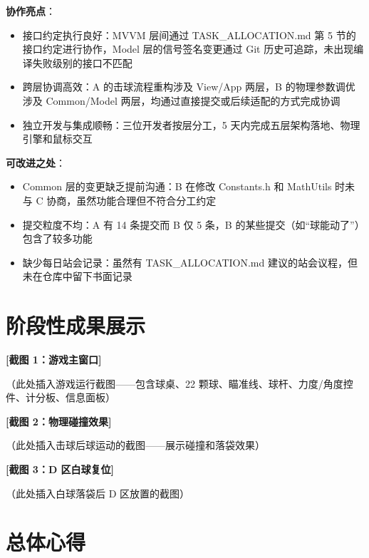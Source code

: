 \documentclass[11pt]{ctexart}
\begin{document}
\textbf{协作亮点}：
\begin{itemize}
\item 接口约定执行良好：MVVM 层间通过 TASK\_ALLOCATION.md 第 5 节的接口约定进行协作，Model 层的信号签名变更通过 Git 历史可追踪，未出现编译失败级别的接口不匹配
\item 跨层协调高效：A 的击球流程重构涉及 View/App 两层，B 的物理参数调优涉及 Common/Model 两层，均通过直接提交或后续适配的方式完成协调
\item 独立开发与集成顺畅：三位开发者按层分工，5 天内完成五层架构落地、物理引擎和鼠标交互
\end{itemize}

\textbf{可改进之处}：
\begin{itemize}
\item Common 层的变更缺乏提前沟通：B 在修改 Constants.h 和 MathUtils 时未与 C 协商，虽然功能合理但不符合分工约定
\item 提交粒度不均：A 有 14 条提交而 B 仅 5 条，B 的某些提交（如“球能动了”）包含了较多功能
\item 缺少每日站会记录：虽然有 TASK\_ALLOCATION.md 建议的站会议程，但未在仓库中留下书面记录
\end{itemize}

\section{阶段性成果展示}

\begin{center}
\textbf{[截图 1：游戏主窗口]}
\vspace{1cm}

（此处插入游戏运行截图——包含球桌、22 颗球、瞄准线、球杆、力度/角度控件、计分板、信息面板）

\vspace{2cm}

\textbf{[截图 2：物理碰撞效果]}

\vspace{1cm}

（此处插入击球后球运动的截图——展示碰撞和落袋效果）

\vspace{2cm}

\textbf{[截图 3：D 区白球复位]}

\vspace{1cm}

（此处插入白球落袋后 D 区放置的截图）
\end{center}

\section{总体心得}
\end{document}
